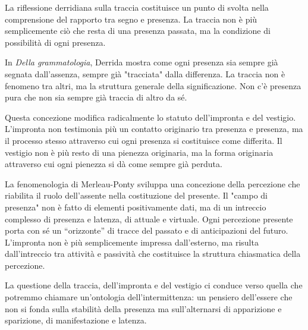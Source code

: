 La riflessione derridiana sulla traccia \cite{derrida1967} costituisce un punto di svolta nella comprensione del rapporto tra segno e presenza. La traccia non è più semplicemente ciò che resta di una presenza passata, ma la condizione di possibilità di ogni presenza.

In \textit{Della grammatologia}, Derrida mostra come ogni presenza sia sempre già segnata dall'assenza, sempre già "tracciata" dalla differenza. La traccia non è fenomeno tra altri, ma la struttura generale della significazione. Non c'è presenza pura che non sia sempre già traccia di altro da sé.

Questa concezione modifica radicalmente lo statuto dell'impronta e del vestigio. L'impronta non testimonia più un contatto originario tra presenza e presenza, ma il processo stesso attraverso cui ogni presenza si costituisce come differita. Il vestigio non è più resto di una pienezza originaria, ma la forma originaria attraverso cui ogni pienezza si dà come sempre già perduta.


La fenomenologia di Merleau-Ponty \cite{merleau-ponty1945} sviluppa una concezione della percezione che riabilita il ruolo dell'assente nella costituzione del presente. Il "campo di presenza" non è fatto di elementi positivamente dati, ma di un intreccio complesso di presenza e latenza, di attuale e virtuale. Ogni percezione presente porta con sé un “orizzonte” di tracce del passato e di anticipazioni del futuro. L'impronta non è più semplicemente impressa dall'esterno, ma risulta dall'intreccio tra attività e passività che costituisce la struttura chiasmatica della percezione.

%

La questione della traccia, dell'impronta e del vestigio ci conduce verso quella che potremmo chiamare un'ontologia dell'intermittenza: un pensiero dell'essere che non si fonda sulla stabilità della presenza ma sull'alternarsi di apparizione e sparizione, di manifestazione e latenza.

